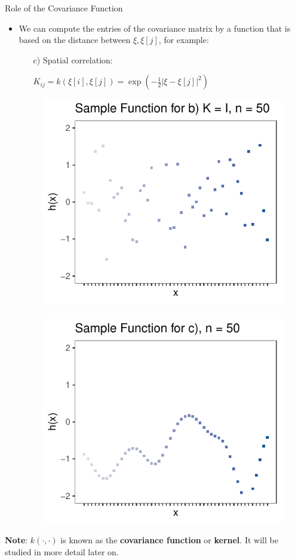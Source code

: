 \begin{vbframe}{Role of the Covariance Function}
\begin{itemize}
  \framebreak 

  \item We can compute the entries of the covariance matrix by a function that is based on the distance between $\xi, \xi[j]$, for example: 
  
  \vspace*{0.2cm}
  \begin{enumerate}
    \item[c)] Spatial correlation: \begin{footnotesize}$K_{ij} = k(\xi[i], \xi[j]) = \exp\left(-\frac{1}{2}\left|\xi - \xi[j]\right|^2\right)$\end{footnotesize}
  \end{enumerate}
  
\begin{figure}
  \includegraphics[width=0.45\linewidth]{figure_man/discrete/example_extreme_50-4.pdf} ~~  \includegraphics[width=0.45\linewidth]{figure_man/discrete/example_extreme_50-3.pdf}
\end{figure}

\end{itemize}

\begin{footnotesize}
\textbf{Note}: $k(\cdot,\cdot)$ is known as the \textbf{covariance function} or \textbf{kernel}. It will be studied in more detail later on.
\end{footnotesize}

\end{vbframe}




